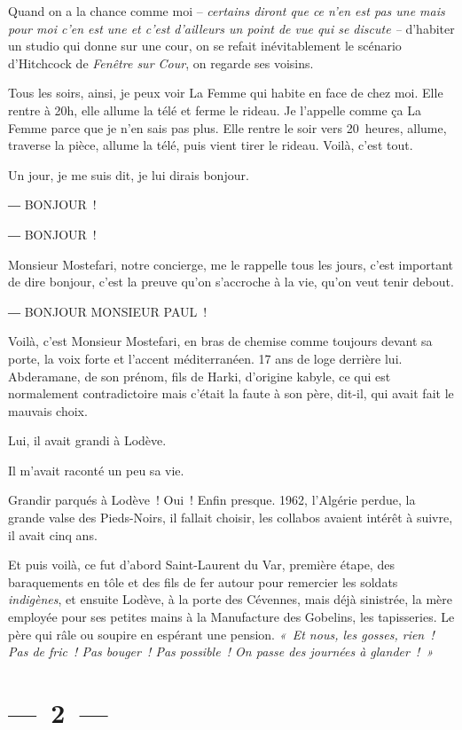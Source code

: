 \documentclass[french,twoside]{book} %
\begin{document}
\noindent Quand on a la chance comme moi – \emph{certains diront que ce n’en est pas une mais pour moi c’en est une et c’est d’ailleurs un point de vue qui se discute –} d’habiter un studio qui donne sur une cour, on se refait inévitablement le scénario d’Hitchcock de \emph{Fenêtre sur Cour}, on regarde ses voisins.\par
Tous les soirs, ainsi, je peux voir La Femme qui habite en face de chez moi. Elle rentre à 20h, elle allume la télé et ferme le rideau. Je l’appelle comme ça La Femme parce que je n’en sais pas plus. Elle rentre le soir vers 20 heures, allume, traverse la pièce, allume la télé, puis vient tirer le rideau. Voilà, c’est tout.\par
Un jour, je me suis dit, je lui dirais bonjour.\par
― BONJOUR !\par
― BONJOUR !\par
Monsieur Mostefari, notre concierge, me le rappelle tous les jours, c’est important de dire bonjour, c’est la preuve qu’on s’accroche à la vie, qu’on veut tenir debout.\par
― BONJOUR MONSIEUR PAUL !\par
\bigbreak
\noindent Voilà, c’est Monsieur Mostefari, en bras de chemise comme toujours devant sa porte, la voix forte et l’accent méditerranéen. 17 ans de loge derrière lui. Abderamane, de son prénom, fils de Harki, d’origine kabyle, ce qui est normalement contradictoire mais c’était la faute à son père, dit-il, qui avait fait le mauvais choix.\par
Lui, il avait grandi à Lodève.\par
Il m’avait raconté un peu sa vie.\par
Grandir parqués à Lodève ! Oui ! Enfin presque. 1962, l’Algérie perdue, la grande valse des Pieds-Noirs, il fallait choisir, les collabos avaient intérêt à suivre, il avait cinq ans.\par
Et puis voilà, ce fut d’abord Saint-Laurent du Var, première étape, des baraquements en tôle et des fils de fer autour pour remercier les soldats \emph{indigènes}, et ensuite Lodève, à la porte des Cévennes, mais déjà sinistrée, la mère employée pour ses petites mains à la Manufacture des Gobelins, les tapisseries. Le père qui râle ou soupire en espérant une pension. \emph{« Et nous, les gosses, rien ! Pas de fric ! Pas bouger ! Pas possible ! On passe des journées à glander ! »}

\section[{— 2 —}]{— 2 —}
\renewcommand{\leftmark}{— 2 —}
\end{document}
